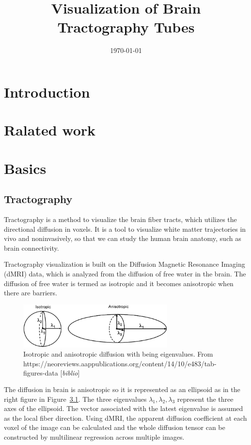 \documentclass[a4paper, 12pt]{report}
\title{Visualization of Brain Tractography Tubes}
\date{\today}
\newcommand{\comment}[1]{{\color{red}[\textit{#1}]}}
\begin{document}
\maketitle
\tableofcontents
\chapter{Introduction}
\chapter{Ralated work}
\chapter{Basics}

\section{Tractography}
Tractography is a method to visualize the brain fiber tracts, which utilizes the directional diffusion in voxels. It is a tool to visualize white matter trajectories in vivo and noninvasively, so that we can study the human brain anatomy, such as brain connectivity.

Tractography visualization is built on the Diffusion Magnetic Resonance Imaging (dMRI) data, which is analyzed from the diffusion of free water in the brain. The diffusion of free water is termed as isotropic and it becomes anisotropic when there are barriers. 

\begin{figure}[h]
	\centering
	\includegraphics[width=0.7\textwidth]{iso_ani_diff}
	\caption{Isotropic and anisotropic diffusion with  being eigenvalues. From
https://neoreviews.aappublications.org/content/14/10/e483/tab-figures-data \comment{biblio}}
	\label{fig:iso_ani_diff}
\end{figure}

The diffusion in brain is anisotropic so it is represented as an ellipsoid as in the right figure in Figure~\ref{fig:iso_ani_diff}. The three eigenvalues  $\lambda_1, \lambda_2, \lambda_3$ represent the three axes of the ellipsoid. The vector associated with the latest eigenvalue is assumed as the local fiber direction.\cite{tak}
Using dMRI, the apparent diffusion coefficient at each voxel of the image can be calculated and the whole diffusion tensor can be constructed by multilinear regression across multiple images.
\end{document}

